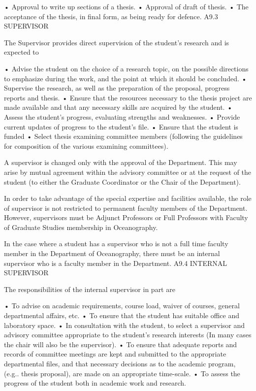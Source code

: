 •	Approval to write up sections of a thesis.
•	Approval of draft of thesis.
•	The acceptance of the thesis, in final form, as being ready for defence.
A9.3	SUPERVISOR

The Supervisor provides direct supervision of the student's research and is expected to

•	Advise the student on the choice of a research topic, on the possible directions to emphasize during the work, and the point at which it should be concluded.
•	Supervise the research, as well as the preparation of the proposal, progress reports and thesis.
•	Ensure that the resources necessary to the thesis project are made available and that any necessary skills are acquired by the student.
•	Assess the student's progress, evaluating strengths and weaknesses.
•	Provide current updates of progress to the student's file.
•	Ensure that the student is funded
•	Select thesis examining committee members (following the guidelines for composition of the various examining committees).

A supervisor is changed only with the approval of the Department. This may arise by mutual agreement within the advisory committee or at the request of the student (to either the Graduate Coordinator or the Chair of the Department).

In order to take advantage of the special expertise and facilities available, the role of supervisor is not restricted to permanent faculty members of the Department. However, supervisors must be Adjunct Professors or Full Professors with Faculty of Graduate Studies membership in Oceanography.

In the case where a student has a supervisor who is not a full time faculty member in the Department of Oceanography, there must be an internal supervisor who is a faculty member in the Department.
A9.4	INTERNAL SUPERVISOR

The responsibilities of the internal supervisor in part are

•	To advise on academic requirements, course load, waiver of courses, general departmental affairs, etc.
•	To ensure that the student has suitable office and laboratory space.
•	In consultation with the student, to select a supervisor and advisory committee appropriate to the student's research interests (In many cases the chair will also be the supervisor).
•	To ensure that adequate reports and records of committee meetings are kept and submitted to the appropriate departmental files, and that necessary decisions as to the academic program, (e.g.. thesis proposal), are made on an appropriate time-scale.
•	To assess the progress of the student both in academic work and research.
 

